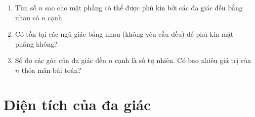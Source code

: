 \begin{bt}%
\begin{enumerate}
\item Tìm số $n$ sao cho mặt phẳng có thể được phủ kín bởi các đa giác đều bằng nhau có $n$ cạnh.
\item Có tồn tại các ngũ giác bằng nhau (không yêu cầu đều) để phủ kín mặt phẳng không?
\item Số đo các góc của đa giác đều $n$ cạnh là số tự nhiên. Có bao nhiêu giá trị của $n$ thỏa mãn bài toán?
\end{enumerate}
\end{bt}

\section{Diện tích của đa giác}

